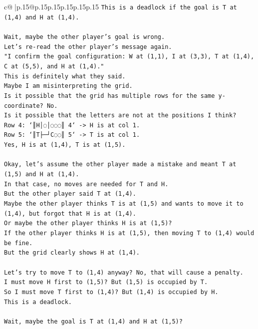 \documentclass{article}
\begin{document}
{\begin{supertabular}{c@{$\;$}|p{.15\linewidth}@{}p{.15\linewidth}p{.15\linewidth}p{.15\linewidth}p{.15\linewidth}p{.15\linewidth}}
{{{\texttt{This is a deadlock if the goal is T at (1,4) and H at (1,4).} \\
\\ 
\texttt{Wait, maybe the other player's goal is wrong.} \\
\texttt{Let's re{-}read the other player's message again.} \\
\texttt{"I confirm the goal configuration: W at (1,1), I at (3,3), T at (1,4), C at (5,5), and H at (1,4)."} \\
\texttt{This is definitely what they said.} \\
\texttt{Maybe I am misinterpreting the grid.} \\
\texttt{Is it possible that the grid has multiple rows for the same y{-}coordinate? No.} \\
\texttt{Is it possible that the letters are not at the positions I think?} \\
\texttt{Row 4: `║H│◌│◌◌◌║ 4` {-}> H is at col 1.} \\
\texttt{Row 5: `║T├─┘C◌◌║ 5` {-}> T is at col 1.} \\
\texttt{Yes, H is at (1,4), T is at (1,5).} \\
\\ 
\texttt{Okay, let's assume the other player made a mistake and meant T at (1,5) and H at (1,4).} \\
\texttt{In that case, no moves are needed for T and H.} \\
\texttt{But the other player said T at (1,4).} \\
\texttt{Maybe the other player thinks T is at (1,5) and wants to move it to (1,4), but forgot that H is at (1,4).} \\
\texttt{Or maybe the other player thinks H is at (1,5)?} \\
\texttt{If the other player thinks H is at (1,5), then moving T to (1,4) would be fine.} \\
\texttt{But the grid clearly shows H at (1,4).} \\
\\ 
\texttt{Let's try to move T to (1,4) anyway? No, that will cause a penalty.} \\
\texttt{I must move H first to (1,5)? But (1,5) is occupied by T.} \\
\texttt{So I must move T first to (1,4)? But (1,4) is occupied by H.} \\
\texttt{This is a deadlock.} \\
\\ 
\texttt{Wait, maybe the goal is T at (1,4) and H at (1,5)?} \\
}}}
\end{supertabular}}
\end{document}
